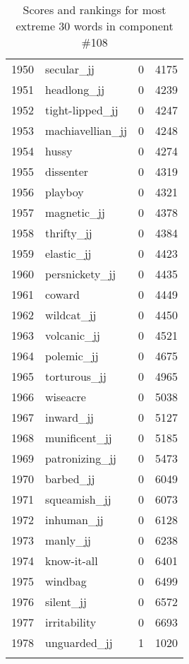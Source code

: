 \begin{longtable}[!htbp]{| rlr@{.}l |}
    1950 & secular\_jj & 0 & 4175 \\
    1951 & headlong\_jj & 0 & 4239 \\
    1952 & tight-lipped\_jj & 0 & 4247 \\
    1953 & machiavellian\_jj & 0 & 4248 \\
    1954 & hussy & 0 & 4274 \\
    1955 & dissenter & 0 & 4319 \\
    1956 & playboy & 0 & 4321 \\
    1957 & magnetic\_jj & 0 & 4378 \\
    1958 & thrifty\_jj & 0 & 4384 \\
    1959 & elastic\_jj & 0 & 4423 \\
    1960 & persnickety\_jj & 0 & 4435 \\
    1961 & coward & 0 & 4449 \\
    1962 & wildcat\_jj & 0 & 4450 \\
    1963 & volcanic\_jj & 0 & 4521 \\
    1964 & polemic\_jj & 0 & 4675 \\
    1965 & torturous\_jj & 0 & 4965 \\
    1966 & wiseacre & 0 & 5038 \\
    1967 & inward\_jj & 0 & 5127 \\
    1968 & munificent\_jj & 0 & 5185 \\
    1969 & patronizing\_jj & 0 & 5473 \\
    1970 & barbed\_jj & 0 & 6049 \\
    1971 & squeamish\_jj & 0 & 6073 \\
    1972 & inhuman\_jj & 0 & 6128 \\
    1973 & manly\_jj & 0 & 6238 \\
    1974 & know-it-all & 0 & 6401 \\
    1975 & windbag & 0 & 6499 \\
    1976 & silent\_jj & 0 & 6572 \\
    1977 & irritability & 0 & 6693 \\
    1978 & unguarded\_jj & 1 & 1020 \\
    \hline
    \caption{Scores and rankings for most extreme 30 words in component \#108} \\
\end{longtable}
